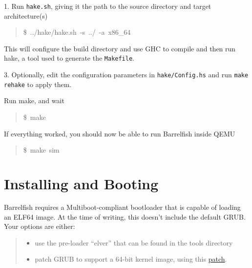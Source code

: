 1. Run \texttt{hake.sh}, giving it the path to the source directory and target
architecture(s)
%
\begin{quote}{\ttfamily \raggedright \noindent
\$~../hake/hake.sh~-s~../~-a~x86\_64
}
\end{quote}

This will configure the build directory and use GHC to compile and then run
hake, a tool used to generate the \texttt{Makefile}.

3. Optionally, edit the configuration parameters in \texttt{hake/Config.hs} and
run \texttt{make rehake} to apply them.
\setcounter{listcnt0}{0}
\begin{list}{.}
{
\addtocounter{listcnt0}{3}
\setlength{\rightmargin}{\leftmargin}
}

\item Run make, and wait
%
\begin{quote}{\ttfamily \raggedright \noindent
\$~make
}
\end{quote}

\item If everything worked, you should now be able to run Barrelfish inside QEMU
%
\begin{quote}{\ttfamily \raggedright \noindent
\$~make~sim
}
\end{quote}
\end{list}


\section{Installing and Booting%
  \label{installing-and-booting}%
}

Barrelfish requires a Multiboot-compliant bootloader that is capable of loading
an ELF64 image. At the time of writing, this doesn't include the default GRUB.
Your options are either:
%
\begin{quote}
%
\begin{itemize}

\item use the pre-loader ``elver'' that can be found in the tools directory

\item patch GRUB to support a 64-bit kernel image, using this \href{http://savannah.gnu.org/bugs/?17963}{patch}.

\end{itemize}

\end{quote}

